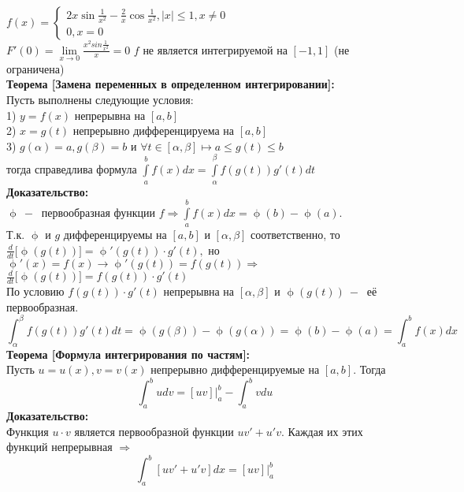 \documentclass[a4paper,12pt]{article} %
\begin{document}
$f(x) = \begin{cases} 2x \sin\frac{1}{x^2} - \frac{2}{x} \cos\frac{1}{x^2}, |x|\leq 1, x \neq 0\\ 0, x =0
\end{cases}$\\ [2mm]
$F'(0) =  \lim\limits_{x\rightarrow 0}\frac{x^2 sin\frac{1}{x^2}}{x} = 0$ $f$ не является интегрируемой на $[-1,1]$  (не ограничена)\\[2mm]
\textbf{Теорема [Замена переменных в определенном интегрировании]:}\\[2mm]
Пусть выполнены следующие условия:\\[2mm]
1) $y = f(x)$ непрерывна на $[a,b]$\\[2mm]
2) $x = g(t)$ непрерывно дифференцируема на $[a,b]$\\[2mm]
3) $g(\alpha) = a, g(\beta) = b$ и $\forall t \in [\alpha, \beta] \longmapsto a \leq g(t)\leq b $\\ [2mm]
тогда справедлива формула $\int\limits_a^b f(x) dx = \int \limits_\alpha^\beta f(g(t))g'(t) dt$\\[2mm]
\textbf{Доказательство:}\\[2mm]
$\upphi ~-~$ первообразная функции $f\Rightarrow \int\limits_a^b f(x)dx = \upphi(b)- \upphi(a)$.\\[2mm]
Т.к. $\upphi$ и $g$ дифференцируемы на $[a,b]$ и $[\alpha, \beta]$ соответственно, то\\[2mm] 
$\frac{d}{dt}\Big[\upphi(g(t))\Big]= \upphi'(g(t))\cdot g'(t),$ но $\upphi'(x) = f(x) \rightarrow \upphi'(g(t))= f(g(t))\Rightarrow$\\ [2mm]
$\frac{d}{dt}\Big[\upphi(g(t))\Big]=f(g(t))\cdot g'(t)$\\ [2mm]
По условию $f(g(t))\cdot g'(t)$ непрерывна на $[\alpha, 
\beta]$ и $\upphi(g(t))~-~$ её первообразная.\\[2mm]
$$\int_\alpha^\beta f(g(t))g'(t)dt = \upphi(g(\beta))- \upphi(g(\alpha))= \upphi(b) - \upphi(a) = \int_a^b f(x)dx $$
\textbf{Теорема [Формула интегрирования по частям]:}\\[2mm]
Пусть $u = u(x), v= v(x)$ непрерывно дифференцируемые на $[a,b]$. Тогда $$\int_a^b udv = [uv]|^b_a - \int_a^b vdu$$
\textbf{Доказательство:}\\[2mm]
Функция $u \cdot v$ является первообразной функции $uv'+u'v$. Каждая их этих функций непрерывная $\Rightarrow$
$$\int_a^b[uv'+u'v]dx = [uv]|^b_a$$
\end{document}

